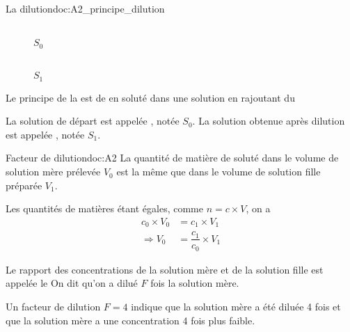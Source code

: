 

\newpage
\vspace*{-36pt}
\begin{doc}{La dilution}{doc:A2_principe_dilution}
  \begin{wrapfigure}[5]{r}{0.5\linewidth}
    \vspace*{-48pt}
    \centering
    \begin{multicols}{4}
     \\[-12pt]
    \footnotesize{$S_0$}
    
    
    
     \\[-12pt]
    \footnotesize{$S_1$}
    \end{multicols}
  \end{wrapfigure}
  \vAligne{-40pt}
  
  \begin{importants}
    Le principe de la  est de  en soluté dans une solution en rajoutant du 
  \end{importants}
  La solution de départ est appelée , notée $S_0$.
  La solution obtenue après dilution est appelée , notée $S_1$.
\end{doc}

\begin{doc}{Facteur de dilution}{doc:A2}
  La quantité de matière de soluté dans le volume de solution mère prélevée $V_0$ est la même que dans le volume de solution fille préparée $V_1$.
  
  Les quantités de matières étant égales, comme $n = c \times V$, on a
  \begin{align*}
    c_0 \times V_0 &= c_1 \times V_1 \\
    \Longrightarrow V_0 &= \dfrac{c_1}{c_0} \times V_1
  \end{align*}

  \begin{importants}  
    Le rapport des concentrations de la solution mère et de la solution fille est appelée le 
    On dit qu'on a dilué $F$ fois la solution mère.
  \end{importants}
  \exemple Un facteur de dilution $F = 4$ indique que la solution mère a été diluée 4 fois et que la solution mère a une concentration 4 fois plus faible.
\end{doc}

